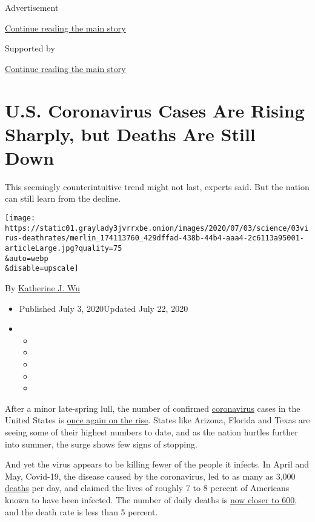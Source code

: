 Advertisement

\protect\hyperlink{after-top}{Continue reading the main story}

Supported by

\protect\hyperlink{after-sponsor}{Continue reading the main story}

\hypertarget{us-coronavirus-cases-are-rising-sharply-but-deaths-are-still-down}{%
\section{U.S. Coronavirus Cases Are Rising Sharply, but Deaths Are Still
Down}\label{us-coronavirus-cases-are-rising-sharply-but-deaths-are-still-down}}

This seemingly counterintuitive trend might not last, experts said. But
the nation can still learn from the decline.

\texttt{[image: https://static01.graylady3jvrrxbe.onion/images/2020/07/03/science/03virus-deathrates/merlin\_174113760\_429dffad-438b-44b4-aaa4-2c6113a95001-articleLarge.jpg?quality=75\\\&auto=webp\\\&disable=upscale]}

By
\href{https://www.nytimes3xbfgragh.onion/by/katherine-j--wu}{Katherine
J. Wu}

\begin{itemize}
\item
  Published July 3, 2020Updated July 22, 2020
\item
  \begin{itemize}
  \item
  \item
  \item
  \item
  \item
  \end{itemize}
\end{itemize}

After a minor late-spring lull, the number of confirmed
\href{https://www.nytimes3xbfgragh.onion/2020/07/22/us/florida-mother-2-children-covid-19.html}{coronavirus}
cases in the United States is
\href{https://www.nytimes3xbfgragh.onion/interactive/2020/us/coronavirus-us-cases.html}{once
again on the rise}. States like Arizona, Florida and Texas are seeing
some of their highest numbers to date, and as the nation hurtles further
into summer, the surge shows few signs of stopping.

And yet the virus appears to be killing fewer of the people it infects.
In April and May, Covid-19, the disease caused by the coronavirus, led
to as many as 3,000
\href{https://www.nytimes3xbfgragh.onion/2020/07/22/us/florida-mother-2-children-covid-19.html}{deaths}
per day, and claimed the lives of roughly 7 to 8 percent of Americans
known to have been infected. The number of daily deaths is
\href{https://www.nytimes3xbfgragh.onion/2020/07/02/briefing/coronavirus-jobs-numbers-joe-biden-your-thursday-briefing.html}{now
closer to 600}, and the death rate is less than 5 percent.

